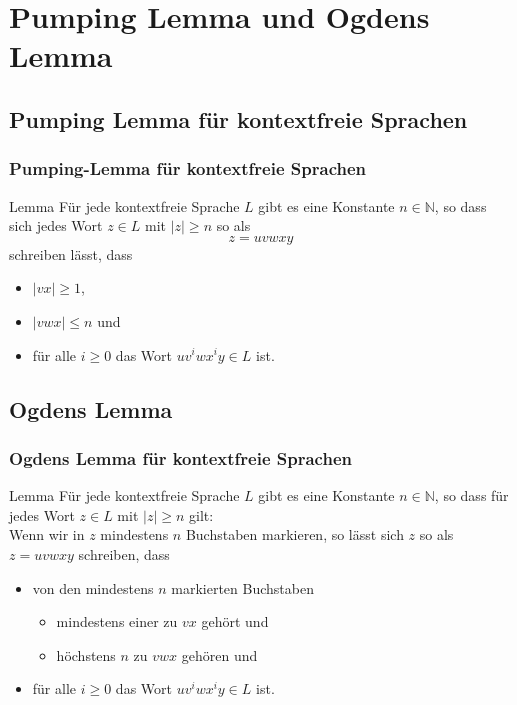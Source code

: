 \section{Pumping Lemma und Ogdens Lemma}
\subsection{Pumping Lemma für kontextfreie Sprachen}
\begin{frame}
\frametitle{Pumping-Lemma für kontextfreie Sprachen}
\begin{exampleblock}{Lemma}
Für jede kontextfreie Sprache $L$ gibt es eine Konstante $n \in \mathbb{N}$,
so dass sich jedes Wort $z \in L$ mit $|z| \geq n$ so als
$$ z = uvwxy $$
schreiben lässt, dass
\begin{itemize}
\item $|vx| \geq 1$,
\item $|vwx| \leq n$ und
\item für alle $i \geq 0$ das Wort $uv^iwx^iy \in L$ ist.
\end{itemize}
\end{exampleblock}
\end{frame}

\subsection{Ogdens Lemma}
\begin{frame}
\frametitle{Ogdens Lemma für kontextfreie Sprachen}
\begin{exampleblock}{Lemma}
Für jede kontextfreie Sprache $L$
gibt es eine Konstante $n \in \mathbb{N}$, so dass für jedes Wort $z \in L$ mit $|z| \geq n$ gilt:\\
Wenn wir in $z$ mindestens $n$ Buchstaben markieren, so lässt sich $z$ so als $z = uvwxy$ schreiben, dass
\begin{itemize}
\item von den mindestens $n$ markierten Buchstaben
\begin{itemize}
\item mindestens einer zu $vx$ gehört und
\item höchstens $n$ zu $vwx$ gehören und
\end{itemize}
\item für alle $i \geq 0$ das Wort $uv^iwx^iy \in L$ ist.
\end{itemize}
\end{exampleblock}
\end{frame}

